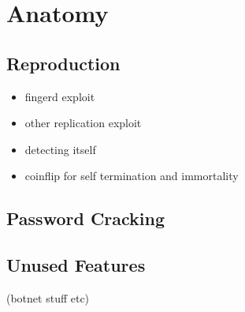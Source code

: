 \section*{Anatomy}

\subsection*{Reproduction}
\begin{itemize}
\item fingerd exploit
\item other replication exploit
\item detecting itself
\item coinflip for self termination and immortality 
\end{itemize}

\subsection*{Password Cracking}

\subsection*{Unused Features}
(botnet stuff etc)